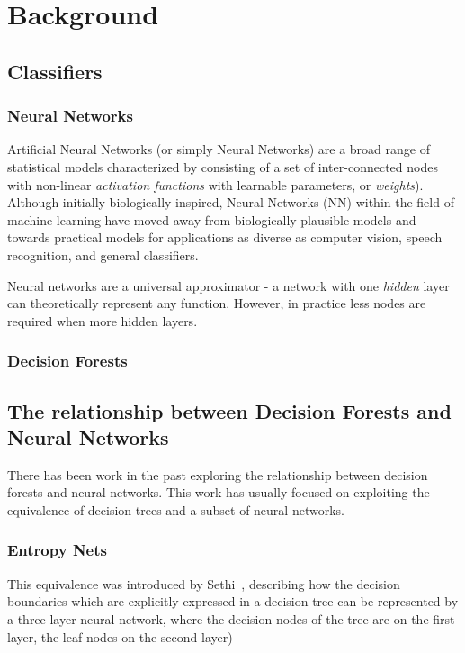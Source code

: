 \documentclass[thesis]{subfiles}
\begin{document}

\chapter{Background}
\label{background}
\ifpdf
    \graphicspath{{Figs/Raster/}{Figs/PDF/}{Figs/}}
\else
    \graphicspath{{Figs/Vector/}{Figs/}}
\fi

\section{Classifiers}
\subsection{Neural Networks}
Artificial Neural Networks (or simply Neural Networks) are a broad range of statistical models characterized by consisting of a set of inter-connected nodes with non-linear \emph{activation functions} with learnable parameters, or \emph{weights}). Although initially biologically inspired, Neural Networks (NN) within the field of machine learning have moved away from biologically-plausible models and towards practical models for applications as diverse as computer vision, speech recognition, and general classifiers.

Neural networks are a universal approximator - a network with one \emph{hidden} layer can theoretically represent any function. However, in practice less nodes are required when more hidden layers.
\subsection{Decision Forests}

\section{The relationship between Decision Forests and Neural Networks}
There has been work in the past exploring the relationship between decision forests and neural networks. This work has usually focused on exploiting the equivalence of decision trees and a subset of neural networks.

\subsection{Entropy Nets}
This equivalence was introduced by Sethi~\cite{Sethi1990}, describing how the decision boundaries which are explicitly expressed in a decision tree can be represented by a three-layer neural network, where the decision nodes of the tree are on the first layer, the leaf nodes on the second layer)
\end{document}
